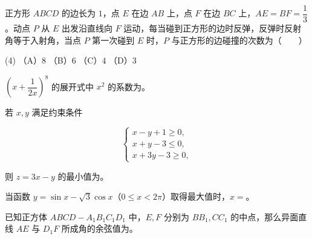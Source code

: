 \begin{question}
正方形 $ABCD$ 的边长为 $1$，点 $E$ 在边 $AB$ 上，点 $F$ 在边 $BC$ 上，$AE=BF=\dfrac13$。动点 $P$ 从 $E$ 出发沿直线向 $F$ 运动，每当碰到正方形的边时反弹，反弹时反射角等于入射角，当点 $P$ 第一次碰到 $E$ 时，$P$ 与正方形的边碰撞的次数为\mbox{（　　）}

\begin{gkopts}(4)
\task （A）$8$
\task （B）$6$
\task （C）$4$
\task （D）$3$
\end{gkopts}

\end{question}

\begin{question}
$\left(x+\dfrac1{2x}\right)^8$ 的展开式中 $x^2$ 的系数为\underline{\hspace{2cm}}。

\end{question}
\begin{question}
若 $x,y$ 满足约束条件

\nopagebreak[4]
\[
\begin{cases}
x-y+1\geq0,\\
x+y-3\leq0,\\
x+3y-3\geq0,
\end{cases}
\]

则 $z=3x-y$ 的最小值为\underline{\hspace{2cm}}。

\end{question}
\begin{question}
当函数 $y=\sin x-\sqrt3\cos x$（$0\leq x<2\pi$）取得最大值时，$x=$\underline{\hspace{2cm}}。

\end{question}
\begin{question}
已知正方体 $ABCD-A_1B_1C_1D_1$ 中，$E,F$ 分别为 $BB_1,CC_1$ 的中点，那么异面直线 $AE$ 与 $D_1F$ 所成角的余弦值为\underline{\hspace{2cm}}。

\end{question}

